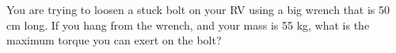 You are trying to loosen a stuck bolt on your RV using a
big wrench that is 50 cm long. If you hang from the wrench,
and your mass is 55 kg, what is the maximum torque you can
exert on the bolt? \answercheck
